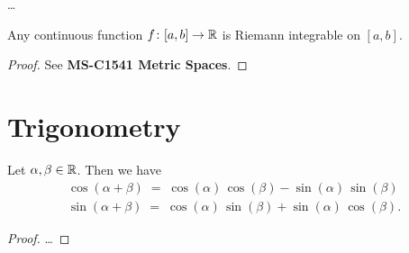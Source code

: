 \begin{definition}
  \label{def:riemann_integral}
  \ldots
\end{definition}

\begin{lemma}
  \label{lem:continuous_implies_riemann_integrable}
  Any continuous function $f \colon [a,b] \to \mathbb{R}$ is Riemann
  integrable on $[a,b]$.
\end{lemma}
\begin{proof}
  See \textbf{MS-C1541 Metric Spaces}.
\end{proof}



\section{Trigonometry}

\begin{lemma}
  \label{lem:trigonometric_angle_sum}
  Let $\alpha, \beta \in \mathbb{R}$. Then we have
  \begin{align*}
    \cos (\alpha + \beta) \; = \; \cos (\alpha) \, \cos (\beta) - \sin (\alpha) \, \sin (\beta) \\
    \sin (\alpha + \beta) \; = \; \cos (\alpha) \, \sin (\beta) + \sin (\alpha) \, \cos (\beta) .
  \end{align*}
\end{lemma}
\begin{proof}
  \ldots
\end{proof}
